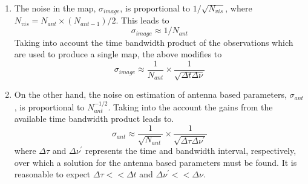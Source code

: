 \documentclass[11pt]{article}
\begin{document}
\begin{enumerate}
\item The noise in the map, $\sigma_{image}$, is proportional to $1/\sqrt{N_{vis}}$, where $N_{vis} = N_{ant} \times (N_{ant-1})/2$. 
This leads to 
\begin{equation}
\sigma_{image} \approx1/N_{ant}
\end{equation}
Taking into account the time bandwidth product of the observations which are used to produce a single map, the above modifies to
\begin{equation}
\sigma_{image} \approx\frac{1}{N_{ant}} \times \frac{1}{\sqrt{\Delta t \Delta \nu}}
\end{equation}

\item On the other hand, the noise on estimation of antenna based parameters, $\sigma_{ant}$, is proportional to $N_{ant}^{-1/2}$.
Taking into the account the gains from the available time bandwidth product leads to.
\begin{equation}
\sigma_{ant} \approx\frac{1}{\sqrt{N_{ant}}} \times \frac{1}{\sqrt{\Delta \tau \Delta \nu^{\prime}}}
\end{equation}
where $\Delta \tau$ and $\Delta \nu^{\prime}$ represents the time and bandwidth interval, respectively, over which a solution for the antenna based parameters must be found.
It is reasonable to expect $\Delta \tau << \Delta t$ and $\Delta \nu^{\prime} << \Delta \nu$.


\end{enumerate}
\end{document}
